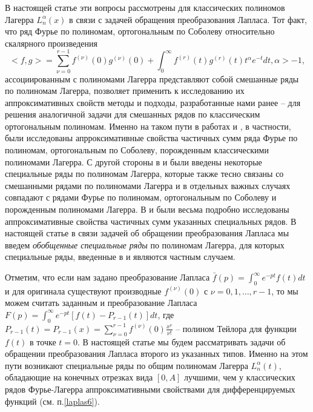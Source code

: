 В настоящей статье эти вопросы рассмотрены для классических полиномов Лагерра $L_n^\alpha(x)$ в связи с задачей обращения преобразования Лапласа. Тот факт, что ряд Фурье по полиномам, ортогональным по Соболеву относительно скалярного произведения
\begin{equation}\label{laplas-1.1}
<f,g>=\sum_{\nu=0}^{r-1}f^{(\nu)}(0)g^{(\nu)}(0)+\int_0^\infty f^{(r)}(t)g^{(r)}(t)t^\alpha e^{-t}dt, \alpha>-1,
\end{equation}
ассоциированным с полиномами Лагерра представляют собой смешанные ряды по полиномам Лагерра, позволяет применить к исследованию их аппроксимативных свойств  методы и подходы, разработанные нами ранее \cite{Shar13} -- \cite{Shar16} для решения аналогичной задачи для смешанных рядов по классическим ортогональным полиномам. Именно на таком пути в работах  \cite{Shar11} и \cite{Shar12}, в частности, были исследованы апрроксимативные свойства частичных сумм ряда Фурье по полиномам, ортогональным по Соболеву, порожденным классическими полиномами Лагерра. С другой стороны в \cite{Shar11} и \cite{Shar12} были введены некоторые специальные ряды по полиномам Лагерра, которые также тесно связаны со смешанными рядами по полиномами Лагерра и в отдельных важных случаях совпадают с рядами Фурье по полиномам, ортогональным по Соболеву и порожденным полиномами Лагерра. В \cite{Shar11} и \cite{Shar12} были весьма подробно исследованы аппроксимативные свойства частичных сумм указанных специальных рядов. В настоящей статье в связи задачей об обращении преобразования Лапласа мы введем \textit{ обобщенные специальные ряды} по полиномам Лагерра,  для которых специальные ряды, введенные в \cite{Shar11} и \cite{Shar12} являются частным случаем.

 Отметим, что если нам задано преобразование Лапласа
$\bar f(p)=\int_0^\infty e^{-pt}f(t)dt$ и для оригинала существуют производные $f^{(\nu)}(0)$ с $\nu=0,1,\ldots, r-1$, то мы можем считать заданным и преобразование Лапласа $F(p)=\int_0^\infty e^{-pt}[f(t)-P_{r-1}(t)]dt$, где $P_{r-1}(t)=P_{r-1}(x)=\sum\nolimits_{\nu=0}^{r-1}f^{(\nu)}(0)\frac{x^\nu}{\nu!}$ -- полином Тейлора для функции $f(t)$ в точке $t=0$. В настоящей статье мы будем рассматривать задачи об обращении преобразования Лапласа второго из указанных типов. Именно на этом пути возникают специальные ряды по общим полиномам Лагерра $L_n^{\alpha}(t)$, обладающие на конечных отрезках вида $[0,A]$ лучшими, чем у классических рядов Фурье-Лагерра аппроксимативными свойствами для дифференцируемых функций   (см. п.\ref{laplas6}).



